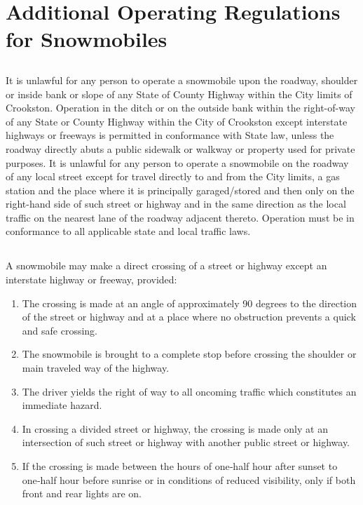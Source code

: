 \section{Additional Operating Regulations for Snowmobiles}
\subsection{}
It is unlawful for any person to operate a snowmobile upon the roadway, shoulder or inside bank or slope of any State of County Highway within the City limits of Crookston. Operation in the ditch or on the outside bank within the right-of-way of any State or County Highway within the City of Crookston except interstate highways or freeways is permitted in conformance with State law, unless the roadway directly abuts a public sidewalk or walkway or property used for private purposes. It is unlawful for any person to operate a snowmobile on the roadway of any local street except for travel directly to and from the City limits, a gas station and the place where it is principally garaged/stored and then only on the right-hand side of such street or highway and in the same direction as the local traffic on the nearest lane of the roadway adjacent thereto. Operation must be in conformance to all applicable state and local traffic laws.
\subsection{}
A snowmobile may make a direct crossing of a street or highway except an interstate highway or freeway, provided:
\begin{enumerate}
    \item The crossing is made at an angle of approximately 90 degrees to the direction of the street or highway and at a place where no obstruction prevents a quick and safe crossing.
    \item The snowmobile is brought to a complete stop before crossing the shoulder or main traveled way of the highway.
    \item The driver yields the right of way to all oncoming traffic which constitutes an immediate hazard.
    \item In crossing a divided street or highway, the crossing is made only at an intersection of such street or highway with another public street or highway.
    \item If the crossing is made between the hours of one‑half hour after sunset to one‑half hour before sunrise or in conditions of reduced visibility, only if both front and rear lights are on.
\end{enumerate}
